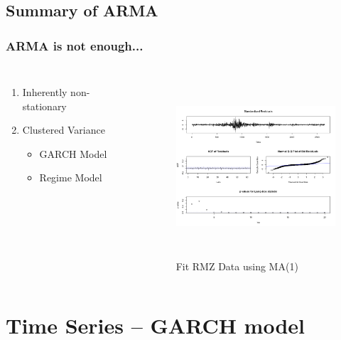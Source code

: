 \documentclass{beamer}
\newcommand\Fontviii{\fontsize{8}{9.2}\selectfont}
\begin{document}
\subsection{Summary of ARMA}
\begin{frame}
\frametitle{ARMA is not enough...}
\Fontviii
\begin{columns}[c]
\begin{enumerate}
\item Inherently non-stationary
\item Clustered Variance
\begin{itemize}
\item GARCH Model
\item Regime Model
\end{itemize}
\end{enumerate}

\begin{figure}[h]
\centering 
\includegraphics[width=6cm,height = 6cm]{../results/DiagnosticRMZ}
\label{fig: dailyReturns}
\caption{Fit RMZ Data using MA(1)}
\end{figure}

\end{columns}
\end{frame}

\section{Time Series – GARCH model}
\end{document}
